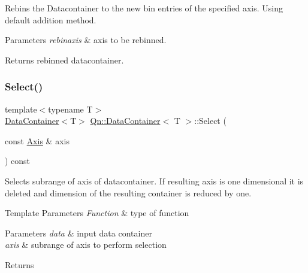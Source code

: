 Rebins the Datacontainer to the new bin entries of the specified axis. Using default addition method. 
\begin{DoxyParams}{Parameters}
{\em rebinaxis} & axis to be rebinned. \\
\hline
\end{DoxyParams}
\begin{DoxyReturn}{Returns}
rebinned datacontainer. 
\end{DoxyReturn}
\mbox{\label{classQn_1_1DataContainer_a6f6590866c0cfe451cf966292d3eb69a}} 
\subsubsection{\texorpdfstring{Select()}{Select()}}
{\footnotesize\ttfamily template$<$typename T$>$ \\
\mbox{\hyperlink{classQn_1_1DataContainer}{Data\+Container}}$<$T$>$ \mbox{\hyperlink{classQn_1_1DataContainer}{Qn\+::\+Data\+Container}}$<$ T $>$\+::Select (\begin{DoxyParamCaption}\item[{const \mbox{\hyperlink{classQn_1_1Axis}{Axis}} \&}]{axis }\end{DoxyParamCaption}) const\hspace{0.3cm}{\ttfamily [inline]}}

Selects subrange of axis of datacontainer. If resulting axis is one dimensional it is deleted and dimension of the resulting container is reduced by one. 
\begin{DoxyTemplParams}{Template Parameters}
{\em Function} & type of function \\
\hline
\end{DoxyTemplParams}

\begin{DoxyParams}{Parameters}
{\em data} & input data container \\
\hline
{\em axis} & subrange of axis to perform selection \\
\hline
\end{DoxyParams}
\begin{DoxyReturn}{Returns}

\end{DoxyReturn}
\mbox{\label{classQn_1_1DataContainer_a655e42708d02b905b28cba7fb4f0dd42}} 
